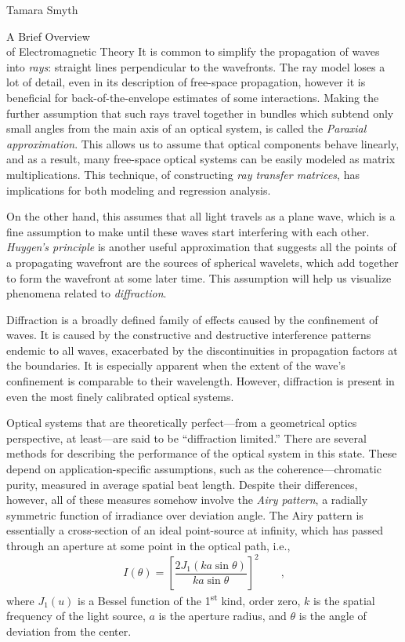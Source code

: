 \documentclass[a4paper,10pt]{report}
\numberwithin{equation}{section}
\begin{document}
\begin{chapter}{Tamara Smyth}
\begin{section}{A Brief Overview \\of Electromagnetic Theory}
It is common to simplify the propagation of waves into \emph{rays}: straight lines perpendicular to the wavefronts. The ray model loses a lot of detail, even in its description of free-space propagation, however it is beneficial for back-of-the-envelope estimates of some interactions. \cite[p.~95]{Hecht1987} Making the further assumption that such rays travel together in bundles which subtend only small angles from the main axis of an optical system, is called the \emph{Paraxial approximation}. This allows us to assume that optical components behave linearly, and as a result, many free-space optical systems can be easily modeled as matrix multiplications. \cite[p.~444]{Goodman2005} This technique, of constructing \emph{ray transfer matrices}, has implications for both modeling and regression analysis.

On the other hand, this assumes that all light travels as a plane wave, which is a fine assumption to make until these waves start interfering with each other. \emph{Huygen's principle} is another useful approximation that suggests all the points of a propagating wavefront are the sources of spherical wavelets, which add together to form the wavefront at some later time. This assumption will help us visualize phenomena related to \emph{diffraction}. \cite[p.~100]{Hecht1987}

Diffraction is a broadly defined family of effects caused by the confinement of waves. It is caused by the constructive and destructive interference patterns endemic to all waves, exacerbated by the discontinuities in propagation factors at the boundaries. It is especially  apparent when the extent of the wave's confinement is comparable to their wavelength. \cite[p.~32]{Goodman2005} However, diffraction is present in even the most finely calibrated optical systems. 

Optical systems that are theoretically perfect---from a geometrical optics perspective, at least---are said to be ``diffraction limited.'' \cite[p.~143]{Hecht1987} There are several methods for describing the performance of the optical system in this state. These depend on application-specific assumptions, such as the coherence---chromatic purity, measured in average spatial beat length. Despite their differences, however, all of these measures somehow involve the \emph{Airy pattern}, a radially symmetric function of irradiance over deviation angle. The Airy pattern is essentially a cross-section of an ideal point-source at infinity, which has passed through an aperture at some point in the optical path, i.e., \cite[p.~445]{Hecht1987}
\begin{equation}\label{airy_patt}
I(\theta) = \left[ \frac{2 J_1 (ka \sin{\theta})}{ka \sin{\theta}} \right]^2 \qquad \text{,}
\end{equation}
where $J_1(u)$ is a Bessel function of the 1\textsuperscript{st} kind, order zero, $k$ is the spatial frequency of the light source, $a$ is the aperture radius, and $\theta$ is the angle of deviation from the center. \cite[p.~445]{Hecht1987}


\end{section}
\end{chapter}
\end{document}
